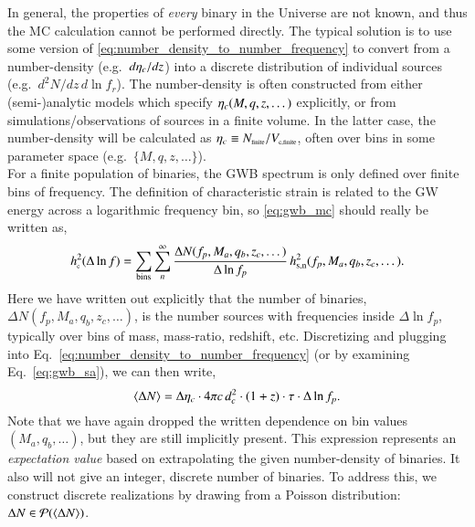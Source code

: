         In general, the properties of \textit{every} binary in the Universe are not known, and thus the MC calculation cannot be performed directly.  The typical solution is to use some version of \eqref{eq:number_density_to_number_frequency} to convert from a number-density (e.g.~$d\eta_c/dz$) into a discrete distribution of individual sources (e.g.~$d^2 N / dz \, d\ln f_r$).  The number-density is often constructed from either (semi-)analytic models which specify $\eta_c(M,q,z,\dots)$ explicitly, or from simulations/observations of sources in a finite volume.  In the latter case, the number-density will be calculated as $\ndens \equiv N_\trt{finite}/V_\trt{c,finite}$, often over bins in some parameter space (e.g.~$\{M, q, z, \dots\}$). \\

        For a finite population of binaries, the GWB spectrum is only defined over finite bins of frequency.  The definition of characteristic strain is related to the GW energy across a logarithmic frequency bin, so \eqref{eq:gwb_mc} should really be written as,
        \begin{equation}
            \label{eq:gwb_discrete}
            \hc^2(\Delta \ln f) = \sum_\textrm{bins} \sum_n^\infty \frac{\Delta N(f_p,M_a,q_b,z_c,\dots)}{\Delta \ln f_p} \, \hsn^2(f_p,M_a,q_b,z_c,\dots).
        \end{equation}
        Here we have written out explicitly that the number of binaries, $\Delta N(f_p,M_a,q_b,z_c,\dots)$, is the number sources with frequencies inside $\Delta \ln f_p$, typically over bins of mass, mass-ratio, redshift, etc.  Discretizing and plugging into Eq.~\ref{eq:number_density_to_number_frequency} (or by examining Eq.~\ref{eq:gwb_sa}), we can then write,
        \begin{equation}
            \label{eq:expectation_number_of_binaries}
            \langle \Delta N \rangle = \Delta \eta_c \cdot 4\pi c \, d_c^2 \cdot (1+z) \cdot \tau \cdot \Delta \ln f_p.
        \end{equation}
        Note that we have again dropped the written dependence on bin values $(M_a, q_b, \dots)$, but they are still implicitly present.  This expression represents an \textit{expectation value} based on extrapolating the given number-density of binaries.  It also will not give an integer, discrete number of binaries.  To address this, we construct discrete realizations by drawing from a Poisson distribution: $\Delta N \in \mathcal{P}(\langle \Delta N \rangle)$. \\

